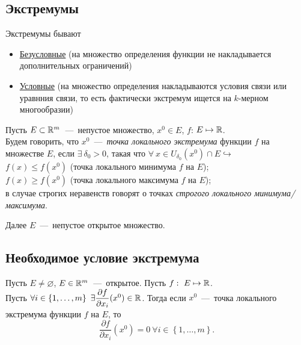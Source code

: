 \subsection{Экстремумы}

Экстремумы бывают \begin{itemize}
    \item \underline{Безусловные} (на множество определения функции не накладывается дополнительных ограничений)
    \item \underline{Условные} (на множество определения накладываются условия связи или уравнния связи, то есть фактически экстремум ищется на $k$-мерном многообразии)
\end{itemize}

\begin{definition}
    Пусть $E \subset \mathbb{R} ^ m$~---~непустое множество, $x^0 \in E$, $f$: $E \mapsto \mathbb{R}$. \\ Будем говорить, что $x^0$~---~\textit{точка локального экстремума} функции $f$ на множестве $E$, если $\exists \ \delta_0 > 0$, такая что $\forall \ x \in U_{\delta_0}(x^0) \cap E \hookrightarrow$ \\
    $ f(x) \le f(x^0)$ (точка локального минимума $f$ на $E$); \\
    $ f(x) \ge f(x^0)$ (точка локального максимума $f$ на $E$); \\
    в случае строгих неравенств говорят о точках \textit{строгого локального минимума/максимума}.
\end{definition}

Далее $E$~---~непустое открытое множество.

\subsection{Необходимое условие экстремума}

\begin{theorem}
    Пусть $E \neq \varnothing$, $E \in \mathbb{R}^m$~---~открытое. Пусть $f: \ E \mapsto \mathbb{R}$. \\ Пусть $\forall i \in \left\{ 1, \dots, m\right\} \ \exists \dfrac{\partial f}{\partial x_i} (x^0) \in \mathbb{R}$. Тогда если $x^0$~---~точка локального экстремума функции $f$ на $E$, то $$\dfrac{\partial f}{\partial x_i}(x^0) = 0 \ \forall i \in \left\{1, \ldots, m \right\}.$$
\end{theorem}

